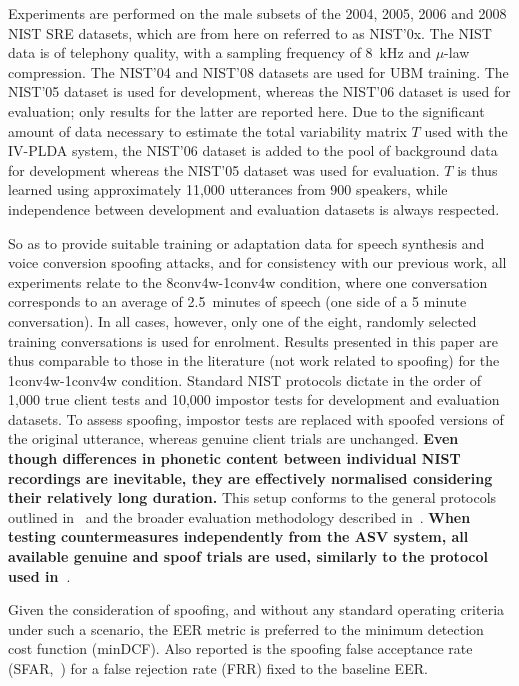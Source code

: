 
Experiments are performed on the male subsets of the 2004, 2005, 2006 and 2008 NIST SRE datasets, which are from here on referred to as NIST'0x.  The NIST data is of telephony quality, with a sampling frequency of 8~kHz and $\mu$-law compression.
The NIST'04 and NIST'08 datasets are used for UBM training.
The NIST'05 dataset is used for development, whereas the NIST'06 dataset is used for evaluation;  
only results for the latter are reported here.
Due to the significant amount of data necessary to estimate the total variability matrix $T$ used with the IV-PLDA system, the NIST'06 dataset is added to the pool of background data for development whereas the NIST'05 dataset was used for evaluation. 
$T$ is thus learned using approximately 11,000 utterances from 900 speakers, while independence between development and evaluation datasets is always respected.
 
So as to provide suitable training or adaptation data for speech synthesis and voice conversion spoofing attacks, and for consistency with our previous work, all experiments relate to the 8conv4w-1conv4w condition, where one conversation corresponds to an average of 2.5~minutes of speech (one side of a 5 minute conversation).
In all cases, however, only one of the eight, randomly selected training conversations is used for enrolment. 
Results presented in this paper are thus comparable to those in the literature (not work related to spoofing) for the 1conv4w-1conv4w condition. 
Standard NIST protocols dictate in the order of 1,000 true client tests and 10,000 impostor tests for development and evaluation datasets. 
To assess spoofing, impostor tests are replaced with spoofed versions of the original utterance, whereas genuine client trials are unchanged. {\bfseries Even though differences in phonetic content between individual NIST recordings are inevitable, they are effectively normalised considering their relatively long duration.}
This setup conforms to the general protocols outlined in~\cite{Wu2014a} and the broader evaluation methodology described in~\cite{Hadid2015}. {\bfseries When testing countermeasures independently from the ASV system, all available genuine and spoof trials are used, similarly to the protocol used in~\cite{Wu2015}}.

Given the consideration of spoofing, and without any standard operating criteria under such a scenario, the EER metric is preferred to the minimum detection cost function (minDCF).  Also reported is the spoofing false acceptance rate (SFAR,~\cite{Johnson2010}) for a false rejection rate (FRR) fixed to the baseline EER.
